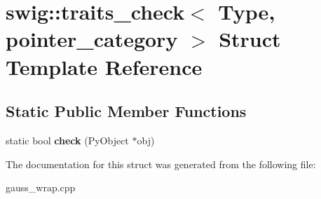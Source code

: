 \hypertarget{structswig_1_1traits__check_3_01_type_00_01pointer__category_01_4}{\section{swig\-:\-:traits\-\_\-check$<$ Type, pointer\-\_\-category $>$ Struct Template Reference}
\label{structswig_1_1traits__check_3_01_type_00_01pointer__category_01_4}
}
\subsection*{Static Public Member Functions}
\begin{DoxyCompactItemize}
\item 
\hypertarget{structswig_1_1traits__check_3_01_type_00_01pointer__category_01_4_ae3cc14b7411d171e1cf97aabd9ff92c5}{static bool {\bfseries check} (Py\-Object $\ast$obj)}\label{structswig_1_1traits__check_3_01_type_00_01pointer__category_01_4_ae3cc14b7411d171e1cf97aabd9ff92c5}

\end{DoxyCompactItemize}


The documentation for this struct was generated from the following file\-:\begin{DoxyCompactItemize}
\item 
gauss\-\_\-wrap.\-cpp\end{DoxyCompactItemize}
